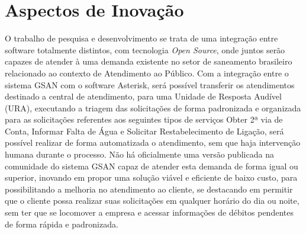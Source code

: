 \section*{Aspectos de Inovação}
O trabalho de pesquisa e desenvolvimento se trata de uma integração entre software totalmente distintos, com tecnologia \textit{Open Source}, onde juntos serão capazes de atender à uma demanda existente no setor de saneamento brasileiro relacionado ao contexto de Atendimento ao Público. Com a integração entre o sistema GSAN com o software Asterisk, será possível transferir os atendimentos destinado a central de atendimento, para uma Unidade de Resposta Audível (URA), executando a triagem das solicitações de forma padronizada e organizada para as solicitações referentes aos seguintes tipos de serviços Obter 2ª via de Conta, Informar Falta de Água e Solicitar Restabelecimento de Ligação, será possível realizar de forma automatizada o atendimento, sem que haja intervenção humana durante o processo. 
Não há oficialmente uma versão publicada na comunidade do sistema GSAN capaz de atender esta demanda de forma igual ou superior, inovando em propor uma solução viável e eficiente de baixo custo, para possibilitando a melhoria no atendimento ao cliente, se destacando em permitir que o cliente possa realizar suas solicitações em qualquer horário do dia ou noite, sem ter que se locomover a empresa e acessar informações de débitos pendentes de forma rápida e padronizada.
